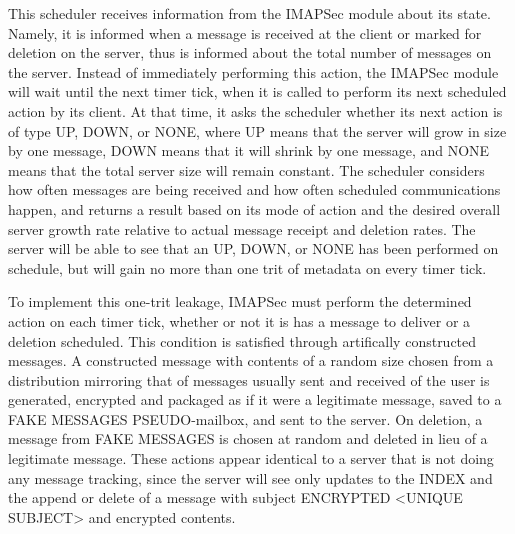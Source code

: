 \documentclass[pageno]{jpaper}
\newcommand{\project}{IMAPSec }
\begin{document}

This scheduler receives information from the \project module about its state. Namely, it is informed when a message is received at the client or marked for deletion on the server, thus is informed about the total number of messages on the server. Instead of immediately performing this action, the \project module will wait until the next timer tick, when it is called to perform its next scheduled action by its client. At that time, it asks the scheduler whether its next action is of type UP, DOWN, or NONE, where UP means that the server will grow in size by one message, DOWN means that it will shrink by one message, and NONE means that the total server size will remain constant. The scheduler considers how often messages are being received and how often scheduled communications happen, and returns a result based on its mode of action and the desired overall server growth rate relative to actual message receipt and deletion rates. The server will be able to see that an UP, DOWN, or NONE has been performed on schedule, but will gain no more than one trit of metadata on every timer tick.

To implement this one-trit leakage, \project must perform the determined action on each timer tick, whether or not it is has a message to deliver or a deletion scheduled. This condition is satisfied through artifically constructed messages. A constructed message with contents of a random size chosen from a distribution mirroring that of messages usually sent and received of the user is generated, encrypted and packaged as if it were a legitimate message, saved to a FAKE MESSAGES PSEUDO-mailbox, and sent to the server. On deletion, a message from FAKE MESSAGES is chosen at random and deleted in lieu of a legitimate message. These actions appear identical to a server that is not doing any message tracking, since the server will see only updates to the INDEX and the append or delete of a message with subject ENCRYPTED <UNIQUE SUBJECT> and encrypted contents.
\end{document}
